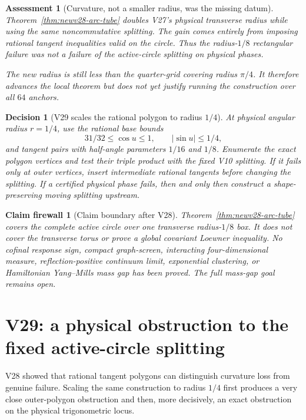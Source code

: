 \documentclass[11pt,oneside]{article}
\newtheorem{assessment}[theorem]{Assessment}
\newtheorem{firewall}[theorem]{Claim firewall}
\newtheorem{decision}[theorem]{Decision}
\theoremstyle{definition}
\theoremstyle{remark}
\begin{document}
\begin{assessment}[Curvature, not a smaller radius, was the missing datum]
\label{ass:newv28}
Theorem~\ref{thm:newv28-arc-tube} doubles V27's physical transverse
radius while using the same noncommutative splitting.  The gain
comes entirely from imposing rational tangent inequalities valid on
the circle.  Thus the radius-\(1/8\) rectangular failure was not a
failure of the active-circle splitting on physical phases.

The new radius is still less than the quarter-grid covering radius
\(\pi/4\).  It therefore advances the local theorem but does not
yet justify running the construction over all \(64\) anchors.
\end{assessment}

\begin{decision}[V29 scales the rational polygon to radius \(1/4\)]
\label{dec:newv28-next}
At physical angular radius \(r=1/4\), use the rational base bounds
\[
 31/32\le\cos u\le1,\qquad |\sin u|\le1/4,
\]
and tangent pairs with half-angle parameters \(1/16\) and \(1/8\).
Enumerate the exact polygon vertices and test their triple product
with the fixed V10 splitting.  If it fails only at outer vertices,
insert intermediate rational tangents before changing the splitting.
If a certified physical phase fails, then and only then construct a
shape-preserving moving splitting upstream.
\end{decision}

\begin{firewall}[Claim boundary after V28]
\label{fire:newv28-final}
Theorem~\ref{thm:newv28-arc-tube} covers the complete active circle
over one transverse radius-\(1/8\) box.  It does not cover the
transverse torus or prove a global covariant Loewner inequality.
No cofinal response sign, compact graph-screen, interacting
four-dimensional measure, reflection-positive continuum limit,
exponential clustering, or Hamiltonian Yang--Mills mass gap has
been proved.  The full mass-gap goal remains open.
\end{firewall}

\section{V29: a physical obstruction to the fixed active-circle splitting}
\label{sec:newv29-fixed-splitting-obstruction}

V28 showed that rational tangent polygons can distinguish curvature
loss from genuine failure.  Scaling the same construction to radius
\(1/4\) first produces a very close outer-polygon obstruction and
then, more decisively, an exact obstruction on the physical
trigonometric locus.
\end{document}
